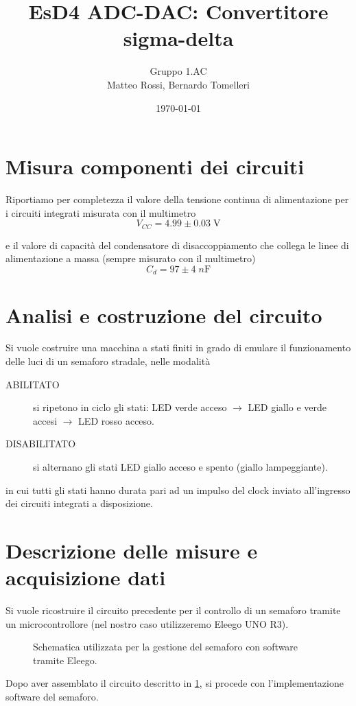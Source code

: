 \documentclass[10pt, a4paper, italian]{article}
\author{Gruppo 1.AC \\ Matteo Rossi, Bernardo Tomelleri}
\title{EsD4 ADC-DAC: Convertitore sigma-delta}
\begin{document}
\date{\today}
\maketitle

\section*{Misura componenti dei circuiti}
Riportiamo per completezza il valore della tensione continua di
alimentazione per i circuiti integrati misurata con il multimetro
\[
V_{CC} = 4.99 \pm 0.03 \; \si{\V}
\]

e il valore di capacità del condensatore di disaccoppiamento che collega le
linee di alimentazione a massa (sempre misurato con il multimetro)
\[
C_d = 97 \pm 4 \; \si{n\F}
\]

\setcounter{section}{0}

\section{Analisi e costruzione del circuito}\label{sec: IC}
Si vuole costruire una macchina a stati finiti in grado di emulare il
funzionamento delle luci di un semaforo stradale, nelle modalità
\begin{description}
\item[ABILITATO] si ripetono in ciclo gli stati: LED verde acceso $\to$
LED giallo e verde accesi $\to$ LED rosso acceso.
\item[DISABILITATO] si alternano gli stati LED giallo acceso e spento
(giallo lampeggiante).
\end{description}
in cui tutti gli stati hanno durata pari ad un impulso del clock inviato
all'ingresso dei circuiti integrati a disposizione.

\section{Descrizione delle misure e acquisizione dati}
Si vuole ricostruire il circuito precedente per il controllo di un semaforo
tramite un microcontrollore (nel nostro caso utilizzeremo Eleego UNO R3).
\begin{figure}[htbp]
    \centering
    \caption{Schematica utilizzata per la gestione del semaforo con software
    tramite Eleego.
    \label{schem: arduino}}
\end{figure}
Dopo aver assemblato il circuito descritto in \cref{schem: arduino}, si
procede con l'implementazione software del semaforo.
\end{document}
